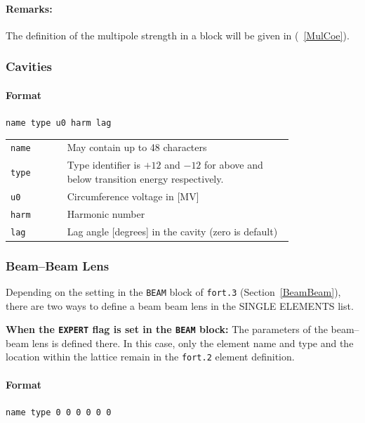 \paragraph{Remarks:}
The definition of the multipole strength in a block will be given in (~\ref{MulCoe}).

\subsubsection{Cavities} \label{Cavities}

\paragraph{Format} \texttt{name type u0 harm lag}

\bigskip
\begin{tabular}{@{}lp{0.8\linewidth}}
    \texttt{name} & May contain up to 48 characters \\
    \texttt{type} & Type identifier is $+12$ and $-12$ for above and below transition energy respectively. \\
    \texttt{u0}   & Circumference voltage in [MV] \\
    \texttt{harm} & Harmonic number \\
    \texttt{lag}  & Lag angle [degrees] in the cavity (zero is default)
\end{tabular}

\subsubsection{Beam--Beam Lens} \label{BBS}

Depending on the setting in the \texttt{BEAM} block of \texttt{fort.3} (Section~\ref{BeamBeam}), there are two ways to define a beam beam lens in the SINGLE ELEMENTS list.

\bigskip
\noindent\textbf{When the \texttt{EXPERT} flag is set in the \texttt{BEAM} block:}
The parameters of the beam--beam lens is defined there.
In this case, only the element name and type and the location within the lattice remain in the \texttt{fort.2} element definition.

\paragraph{Format} \texttt{name type 0 0 0 0 0 0}

